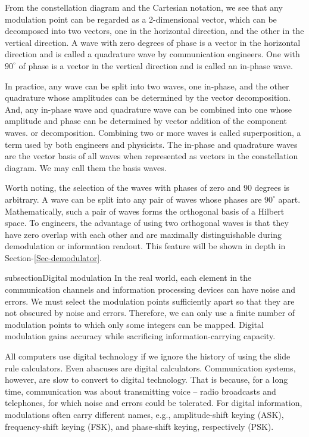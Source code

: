 \documentclass[oneside, letter, 12pt]{book}
\begin{document}
From the constellation diagram and the Cartesian notation, we see that any modulation point can be regarded as a 2-dimensional vector, which can be decomposed into two vectors, one in the horizontal direction, and the other in the vertical direction. A wave with zero degrees of phase is a vector in the horizontal direction and is called a quadrature wave by communication engineers. One with $90^\circ$ of phase is a vector in the vertical direction and is called an in-phase wave.

In practice, any wave can be split into two waves, one in-phase, and the other quadrature whose amplitudes can be determined by the vector decomposition. And, any in-phase wave and quadrature wave can be combined into one whose amplitude and phase can be determined by vector addition of the component waves. or decomposition. Combining two or more waves is called superposition, a term used by both engineers and physicists. The in-phase and quadrature waves are the vector basis of all waves when represented as vectors in the constellation diagram. We may call them the basis waves.

Worth noting, the selection of the waves with phases of zero and 90 degrees is arbitrary. A wave can be split into any pair of waves whose phases are $90^\circ$ apart. Mathematically, such a pair of waves forms the orthogonal basis of a Hilbert space. To engineers, the advantage of using two orthogonal waves is that they have zero overlap with each other and are maximally distinguishable during demodulation or information readout. This feature will be shown in depth in Section-\ref{Sec-demodulator}.

subsection{Digital modulation}
In the real world, each element in the communication channels and information processing devices can have noise and errors. We must select the modulation points sufficiently apart so that they are not obscured by noise and errors. Therefore, we can only use a finite number of modulation points to which only some integers can be mapped. Digital modulation gains accuracy while sacrificing information-carrying capacity.

All computers use digital technology if we ignore the history of using the slide rule calculators. Even abacuses are digital calculators. Communication systems, however, are slow to convert to digital technology. That is because, for a long time, communication was about transmitting voice -- radio broadcasts and telephones, for which noise and errors could be tolerated. For digital information, modulations often carry different names, e.g., amplitude-shift keying (ASK), frequency-shift keying (FSK), and phase-shift keying, respectively (PSK).
\end{document}
